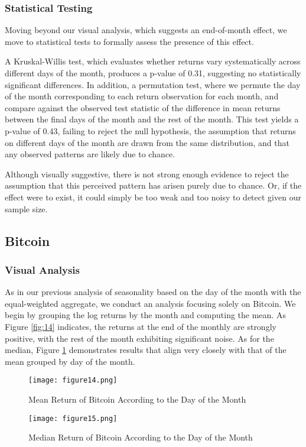 \documentclass[
]{article}
\begin{document}
\subsubsection{Statistical Testing}\label{statistical-testing-2}

Moving beyond our visual analysis, which suggests an end-of-month
effect, we move to statistical tests to formally assess the presence of
this effect.

A Kruskal-Willis test, which evaluates whether returns vary
systematically across different days of the month, produces a p-value of
0.31, suggesting no statistically significant differences. In addition,
a permutation test, where we permute the day of the month corresponding
to each return observation for each month, and compare against the
observed test statistic of the difference in mean returns between the
final days of the month and the rest of the month. This test yields a
p-value of 0.43, failing to reject the null hypothesis, the assumption
that returns on different days of the month are drawn from the same
distribution, and that any observed patterns are likely due to chance.

Although visually suggestive, there is not strong enough evidence to
reject the assumption that this perceived pattern has arisen purely due
to chance. Or, if the effect were to exist, it could simply be too weak
and too noisy to detect given our sample size.

\subsection{Bitcoin}\label{bitcoin-1}

\subsubsection{Visual Analysis}\label{visual-analysis-3}

As in our previous analysis of seasonality based on the day of the month
with the equal-weighted aggregate, we conduct an analysis focusing
solely on Bitcoin. We begin by grouping the log returns by the month and
computing the mean. As Figure \textcolor{blue}{\ref{fig:14}} indicates,
the returns at the end of the monthly are strongly positive, with the
rest of the month exhibiting significant noise. As for the median,
Figure \textcolor{blue}{\ref{fig:15}} demonstrates results that align
very closely with that of the mean grouped by day of the month.

\begin{figure}[H]
    \centering
    \begin{minipage}{0.45\textwidth}
        \centering
        \texttt{[image: figure14.png]}
        \caption{Mean Return of Bitcoin According to the Day of the Month}
        \label{fig:14}
    \end{minipage}
    \hfill
    \begin{minipage}{0.45\textwidth}
        \centering
        \texttt{[image: figure15.png]}
        \caption{Median Return of Bitcoin According to the Day of the Month}
        \label{fig:15}
    \end{minipage}
\end{figure}
\end{document}
